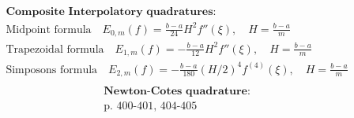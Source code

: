 \documentclass[10pt, a4paper]{article}
\begin{document}
\begin{gather*}
    \textbf{Composite Interpolatory quadratures:} \\
    \text{Midpoint formula} \quad E_{0,m}(f) = \frac{b-a}{24}H^2f''(\xi), \quad H = \frac{b-a}{m} \\
    \text{Trapezoidal formula} \quad E_{1,m}(f) = -\frac{b-a}{12}H^2f''(\xi), \quad H = \frac{b-a}{m}\\
    \text{Simposons formula} \quad E_{2,m}(f) = -\frac{b-a}{180}(H/2)^4f^{(4)}(\xi), \quad H = \frac{b-a}{m} \\
\end{gather*}
\begin{gather*}
    \textbf{Newton-Cotes quadrature:} \\
    \text{p. 400-401, 404-405}
\end{gather*}
\end{document}
